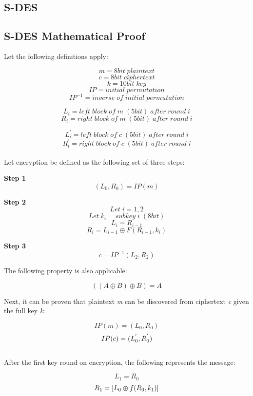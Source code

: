 \documentclass[]{article}
\begin{document}
\vspace*{-0.8cm}
\begin{center}
	\section*{S-DES}
\end{center}

\vspace*{0.8cm}
\subsection*{S-DES Mathematical Proof}

Let the following definitions apply:

$$m = 8bit\;plaintext$$
$$c = 8bit\;ciphertext$$
$$k = 10bit\;key$$
$$IP = initial\;permutation$$
$$IP^{-1} = inverse\;of\;initial\;permutation$$

$$L_i = left\;block\;of\;m\;(5bit)\;after\;round\;i$$
$$R_i = right\;block\;of\;m\;(5bit)\;after\;round\;i$$

$$L^{'}_i = left\;block\;of\;c\;(5bit)\;after\;round\;i$$
$$R^{'}_i = right\;block\;of\;c\;(5bit)\;after\;round\;i$$\\

Let encryption be defined as the following set of three steps:\\

\begin{center}
\textbf{Step 1}
$$(L_0,R_0)=IP(m)$$

\textbf{Step 2}
$$Let\;i=1,2$$
$$Let\;k_i=subkey\;i\;(8bit)$$
$$L_i=R_{i-1}$$
$$R_i=L_{i-1}\oplus F(R_{i-1},k_i)$$

\textbf{Step 3}
$$c=IP^{-1}(L_{2},R_{2})$$
\end{center}

The following property is also applicable:

$$((A\oplus B) \oplus B) = A$$

\newpage
\noindent
Next, it can be proven that plaintext \textit{m} can be discovered from ciphertext \textit{c} given the full key \textit{k}:

$$IP(m)=(L_0,R_0)$$
$$IP(c)=(L^{'}_0,R^{'}_0)\\$$\\

\noindent After the first key round on encryption, the following represents the message:

$$L_1=R_0$$
$$R_1=[L_0\oplus f(R_0,k_1)]\\$$\\
\end{document}
